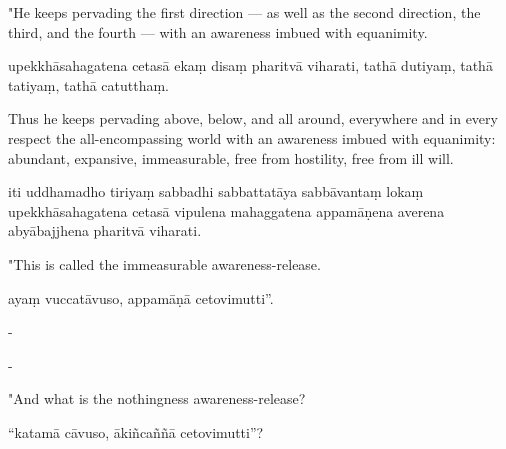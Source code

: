 \begin{samepage}
\begin{leftcolumn*}
"He keeps pervading the first direction — as well as the second direction, the third, and the fourth — with an awareness imbued with equanimity.
\end{leftcolumn*}

\begin{rightcolumn}
upekkhāsahagatena cetasā ekaṃ disaṃ pharitvā viharati, tathā dutiyaṃ, tathā tatiyaṃ, tathā catutthaṃ.
\end{rightcolumn}
\end{samepage}

\begin{samepage}
\begin{leftcolumn*}
Thus he keeps pervading above, below, and all around, everywhere and in every respect the all-encompassing world with an awareness imbued with equanimity: abundant, expansive, immeasurable, free from hostility, free from ill will.
\end{leftcolumn*}

\begin{rightcolumn}
iti uddhamadho tiriyaṃ sabbadhi sabbattatāya sabbāvantaṃ lokaṃ upekkhāsahagatena cetasā vipulena mahaggatena appamāṇena averena abyābajjhena pharitvā viharati.
\end{rightcolumn}
\end{samepage}

\begin{samepage}
\begin{leftcolumn*}
"This is called the immeasurable awareness-release.
\end{leftcolumn*}

\begin{rightcolumn}
ayaṃ vuccatāvuso, appamāṇā cetovimutti”.
\end{rightcolumn}
\end{samepage}

\begin{samepage}
\begin{leftcolumn*}
-
\end{leftcolumn*}

\begin{rightcolumn}
-
\end{rightcolumn}
\end{samepage}

\begin{samepage}
\begin{leftcolumn*}
"And what is the nothingness awareness-release?
\end{leftcolumn*}

\begin{rightcolumn}
“katamā cāvuso, ākiñcaññā cetovimutti”?
\end{rightcolumn}
\end{samepage}

